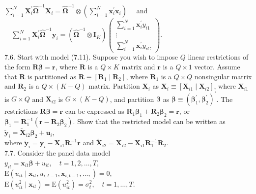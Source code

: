 \documentclass[10pt]{article}
\begin{document}
$\sum_{i=1}^{N} \mathbf{X}_{i}^{\prime} \hat{\boldsymbol{\Omega}}^{-1} \mathbf{X}_{i}=\hat{\boldsymbol{\Omega}}^{-1} \otimes\left(\sum_{i=1}^{N} \mathbf{x}_{i}^{\prime} \mathbf{x}_{i}\right) \quad$ and $\quad \sum_{i=1}^{N} \mathbf{X}_{i}^{\prime} \hat{\boldsymbol{\Omega}}^{-1} \mathbf{y}_{i}=\left(\hat{\boldsymbol{\Omega}}^{-1} \otimes \mathbf{I}_{K}\right)\left(\begin{array}{c}\sum_{i=1}^{N} \mathbf{x}_{i}^{\prime} y_{i 1} \\ \vdots \\ \sum_{i=1}^{N} \mathbf{x}_{i}^{\prime} y_{i G}\end{array}\right)$.\\
7.6. Start with model (7.11). Suppose you wish to impose $Q$ linear restrictions of the form $\mathbf{R} \boldsymbol{\beta}=\mathbf{r}$, where $\mathbf{R}$ is a $Q \times K$ matrix and $\mathbf{r}$ is a $Q \times 1$ vector. Assume that $\mathbf{R}$ is partitioned as $\mathbf{R} \equiv\left[\mathbf{R}_{1} \mid \mathbf{R}_{2}\right]$, where $\mathbf{R}_{1}$ is a $Q \times Q$ nonsingular matrix and $\mathbf{R}_{2}$ is a $Q \times(K-Q)$ matrix. Partition $\mathbf{X}_{i}$ as $\mathbf{X}_{i} \equiv\left[\mathbf{X}_{i 1} \mid \mathbf{X}_{i 2}\right]$, where $\mathbf{X}_{i 1}$ is $G \times Q$ and $\mathbf{X}_{i 2}$ is $G \times(K-Q)$, and partition $\boldsymbol{\beta}$ as $\boldsymbol{\beta} \equiv\left(\boldsymbol{\beta}_{1}^{\prime}, \boldsymbol{\beta}_{2}^{\prime}\right)^{\prime}$. The restrictions $\mathbf{R} \boldsymbol{\beta}=\mathbf{r}$ can be expressed as $\mathbf{R}_{1} \boldsymbol{\beta}_{1}+\mathbf{R}_{2} \boldsymbol{\beta}_{2}=\mathbf{r}$, or $\boldsymbol{\beta}_{1}=\mathbf{R}_{1}^{-1}\left(\mathbf{r}-\mathbf{R}_{2} \boldsymbol{\beta}_{2}\right)$. Show that the restricted model can be written as\\
$\tilde{\mathbf{y}}_{i}=\tilde{\mathbf{X}}_{i 2} \boldsymbol{\beta}_{2}+\mathbf{u}_{i}$,\\
where $\tilde{\mathbf{y}}_{i}=\mathbf{y}_{i}-\mathbf{X}_{i 1} \mathbf{R}_{1}^{-1} \mathbf{r}$ and $\tilde{\mathbf{X}}_{i 2}=\mathbf{X}_{i 2}-\mathbf{X}_{i 1} \mathbf{R}_{1}^{-1} \mathbf{R}_{2}$.\\
7.7. Consider the panel data model\\
$y_{i t}=\mathbf{x}_{i t} \boldsymbol{\beta}+u_{i t}, \quad t=1,2, \ldots, T$,\\
$\mathrm{E}\left(u_{i t} \mid \mathbf{x}_{i t}, u_{i, t-1}, \mathbf{x}_{i, t-1}, \ldots,\right)=0$,\\
$\mathrm{E}\left(u_{i t}^{2} \mid \mathbf{x}_{i t}\right)=\mathrm{E}\left(u_{i t}^{2}\right)=\sigma_{t}^{2}, \quad t=1, \ldots, T$.\\
\end{document}
